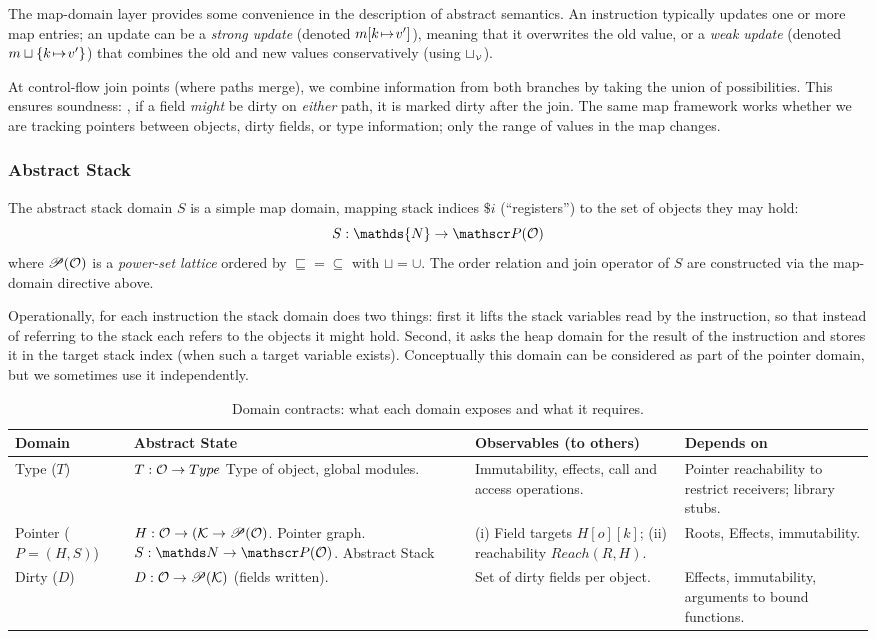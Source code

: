 The map-domain layer provides some convenience in the description of abstract semantics.
An instruction typically updates one or more map entries;
an update can be a \emph{strong update} (denoted $m[k{\hspace{1pt}\mapsto\hspace{1pt}} v']$), meaning that it overwrites the old value,
or a \emph{weak update} (denoted $m\sqcup \{k{\hspace{1pt}\mapsto\hspace{1pt}} v'\}$) that
combines the old and new values conservatively (using $\sqcup_{\scriptscriptstyle\mathcal{V}}$).

At control-flow join points (where paths merge), we combine information from both branches by taking the union of possibilities. This ensures soundness: \eg, if a field \emph{might} be dirty on \emph{either} path, it is marked dirty after the join. The same map framework works whether we are tracking pointers between objects, dirty fields, or type information; only the range of values in the map changes.

\subsubsection*{Abstract Stack} The abstract stack domain $S$ is a simple map domain, mapping stack indices $\$i$ (``registers'') to the set of objects they may hold:
\[S : \mathds{N} \to \powerset(\tO)\]
%
where $\mathscr{P}(\mathcal{O})$ is a \emph{power-set lattice} ordered by ${\sqsubseteq}={\subseteq}$ with ${\sqcup}={\cup}$.
The order relation and join operator of $S$ are constructed via the map-domain
directive above.

Operationally, for each instruction the stack domain does two things: first it lifts the stack variables read by the instruction, so that instead of referring to the stack each refers to the objects it might hold. Second, it asks the heap domain for the result of the instruction and stores it in the target stack index (when such a target variable exists). Conceptually this domain can be considered as part of the pointer domain, but we sometimes use it independently.

\begin{table}[t]
\centering
\small
\begin{tabular}{p{15mm}p{36mm}p{37mm}p{40mm}}
\toprule
\textbf{Domain} & \textbf{Abstract State} & \textbf{Observables (to others)} & \textbf{Depends on} \\
\midrule
Type ($T$) &
  $T:\mathcal{O}\to \mathcal \mathsf{Type}$
  Type of object, global modules. &
  Immutability, effects, call and access operations. &
  Pointer reachability to restrict receivers; library stubs. \\
\addlinespace
Pointer ($P=(H,S)$) &
  $H: \mathcal{O} \to(\mathcal{K} \to \mathscr{P}(\mathcal{O})$.
  Pointer graph. 
  $S:\tN \to \powerset(\tO)$. Abstract Stack
  &
  (i) Field targets $H[o][k]$; (ii) reachability $Reach(R,H)$. &
  Roots, Effects, immutability. \\
\addlinespace
Dirty ($D$) &
  $D:\mathcal{O}\to \mathcal {\mathscr{P}}(\mathcal{K})$ (fields written). &
  Set of dirty fields per object. &
  Effects,  immutability, arguments to bound functions. \\
\bottomrule
\end{tabular}
\caption{Domain contracts: what each domain exposes and what it requires.}
\label{tab:contracts}
\end{table}

